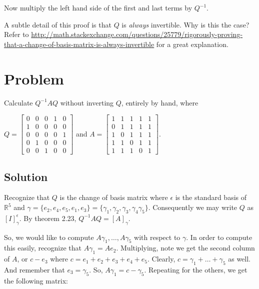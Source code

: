 \documentclass[twoside]{article}
\theoremstyle{definition}
\theoremstyle{definition}
\theoremstyle{remark}
\def\R{{\mathbb R}}
\begin{document}
Now multiply the left hand side of the first and last terms by $Q^{-1}$. 

A subtle detail of this proof is that $Q$ is \emph{always} invertible. Why is this the case? Refer to \url{http://math.stackexchange.com/questions/25779/rigorously-proving-that-a-change-of-basis-matrix-is-always-invertible} for a great explanation.


\section{Problem}

Calculate $Q^{-1} A Q$ without inverting $Q$, entirely by hand, where

$Q = 
\begin{bmatrix}
    0 & 0 & 0 & 1 & 0 \\
    1 & 0 & 0 & 0  & 0 \\
    0 & 0 & 0 & 0 & 1\\
    0 & 1 & 0 & 0 & 0\\
    0 & 0 & 1 & 0 & 0
\end{bmatrix}
$ and $A = 
\begin{bmatrix}
    1 & 1 & 1 & 1 & 1 \\
    0 & 1 & 1 & 1 & 1 \\
    1 & 0 & 1 & 1 & 1 \\
    1 & 1 & 0 & 1 & 1 \\
    1 & 1 & 1 & 0 & 1 
\end{bmatrix}
$.

\subsection{Solution}

Recognize that $Q$ is the change of basis matrix where $\epsilon$ is the standard basis
of $\R^5$ and $\gamma = \{e_2, e_4, e_5, e_1, e_3\} = \{\gamma_1, \gamma_2, \gamma_3, \gamma_4 \gamma_5\}$. Consequently we may write $Q$ as
$[I]^{\epsilon}_{\gamma}$. By theorem 2.23, $Q^{-1} A Q = [A]_{\gamma}$.

So, we would like to compute $A \gamma_1, \ldots, A \gamma_5$ with respect to $\gamma$.
In order to compute this easily, recognize that $A \gamma_1 = A e_2$. Multiplying, note
we get the second column of $A$, or $c - e_3$ where $c = e_1 + e_2 + e_3 + e_4 + e_5$.
Clearly, $c = \gamma_1 + \ldots + \gamma_5$ as well. And remember that $e_3 = \gamma_5$.
So, $A\gamma_1 = c - \gamma_5$. Repeating for the others, we get the following matrix:
\end{document}
